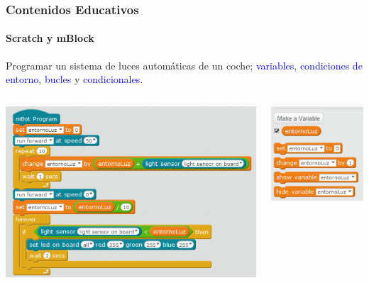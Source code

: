 \documentclass{beamer}
\begin{document}
\begin{frame}
	\frametitle{Contenidos Educativos}
	\framesubtitle{Scratch y mBlock}
	Programar un sistema de luces automáticas de un coche; \textcolor{blue}{variables}, \textcolor{blue}{condiciones de entorno}, \textcolor{blue}{bucles} y \textcolor{blue}{condicionales}.
	\newline
	\begin{columns}
		\begin{column}{0.7\textwidth}
			\includegraphics[width=\columnwidth]{lucesautomaticas.png}
		\end{column}
		\begin{column}{0.30\textwidth}
			\includegraphics[width=\columnwidth]{variableLuz.png}
		\end{column}
	\end{columns}
\end{frame}
\end{document}
